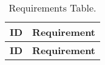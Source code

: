 
\begin{center}
\begin{longtable}{|c|>{\raggedright\arraybackslash}m{15cm}|}
	\caption{\label{tab:allReq}Requirements Table.}\\\hline

    \hline
    \textbf{ID} & \textbf{Requirement}\\\hline
    \endfirsthead
    
    \hline
    \textbf{ID} & \textbf{Requirement}\\\hline
    \endhead 
 

\end{longtable}
\end{center}
